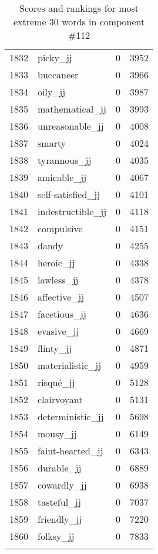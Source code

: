 \begin{longtable}[!htbp]{| rlr@{.}l |}
    1832 & picky\_jj & 0 & 3952 \\
    1833 & buccaneer & 0 & 3966 \\
    1834 & oily\_jj & 0 & 3987 \\
    1835 & mathematical\_jj & 0 & 3993 \\
    1836 & unreasonable\_jj & 0 & 4008 \\
    1837 & smarty & 0 & 4024 \\
    1838 & tyrannous\_jj & 0 & 4035 \\
    1839 & amicable\_jj & 0 & 4067 \\
    1840 & self-satisfied\_jj & 0 & 4101 \\
    1841 & indestructible\_jj & 0 & 4118 \\
    1842 & compulsive & 0 & 4151 \\
    1843 & dandy & 0 & 4255 \\
    1844 & heroic\_jj & 0 & 4338 \\
    1845 & lawless\_jj & 0 & 4378 \\
    1846 & affective\_jj & 0 & 4507 \\
    1847 & facetious\_jj & 0 & 4636 \\
    1848 & evasive\_jj & 0 & 4669 \\
    1849 & flinty\_jj & 0 & 4871 \\
    1850 & materialistic\_jj & 0 & 4959 \\
    1851 & risqué\_jj & 0 & 5128 \\
    1852 & clairvoyant & 0 & 5131 \\
    1853 & deterministic\_jj & 0 & 5698 \\
    1854 & mousy\_jj & 0 & 6149 \\
    1855 & faint-hearted\_jj & 0 & 6343 \\
    1856 & durable\_jj & 0 & 6889 \\
    1857 & cowardly\_jj & 0 & 6938 \\
    1858 & tasteful\_jj & 0 & 7037 \\
    1859 & friendly\_jj & 0 & 7220 \\
    1860 & folksy\_jj & 0 & 7833 \\
    \hline
    \caption{Scores and rankings for most extreme 30 words in component \#112} \\
\end{longtable}
